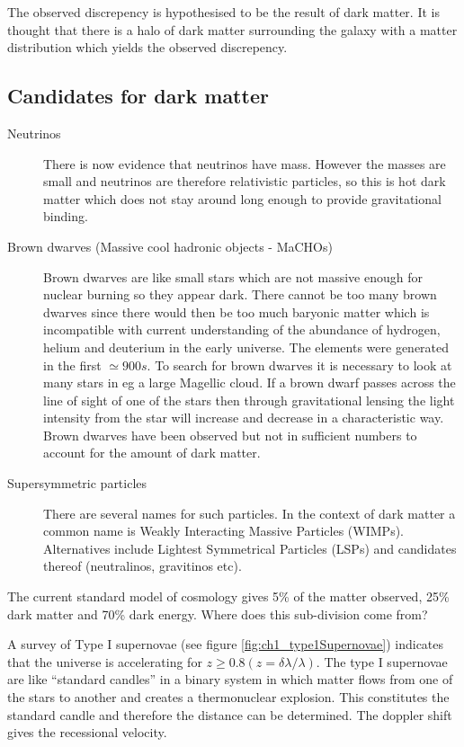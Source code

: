 The observed discrepency is hypothesised to be the result of dark matter.  It is thought that there is a halo of dark matter surrounding the galaxy with a matter distribution which yields the observed discrepency.

\subsection{Candidates for dark matter}

\begin{description}
  \item[Neutrinos]There is now evidence that neutrinos have mass.  However the masses are small and neutrinos are therefore relativistic particles, so this is hot dark matter which does not stay around long enough to provide gravitational binding.
  \item[Brown dwarves (Massive cool hadronic objects - MaCHOs)]Brown dwarves are like small stars which are not massive enough for nuclear burning so they appear dark.  There cannot be too many brown dwarves since there would then be too much baryonic matter which is incompatible with current understanding of the abundance of hydrogen, helium and deuterium in the early universe.  The elements were generated in the first $\simeq 900 s$.  To search for brown dwarves it is necessary to look at many stars in eg a large Magellic cloud.  If a brown dwarf passes across the line of sight of one of the stars then through gravitational lensing the light intensity from the star will increase and decrease in a characteristic way.  Brown dwarves have been observed but not in sufficient numbers to account for the amount of dark matter.
  \item[Supersymmetric particles]There are several names for such particles.  In the context of dark matter a common name is Weakly Interacting Massive Particles (WIMPs).  Alternatives include Lightest Symmetrical Particles (LSPs) and candidates thereof (neutralinos, gravitinos etc).
\end{description}

The current standard model of cosmology gives 5\% of the matter observed, 25\% dark matter and 70\% dark energy.  Where does this sub-division come from?

A survey of Type I supernovae (see figure \ref{fig:ch1_type1Supernovae}) indicates that the universe is accelerating for $z \ge 0.8 (z = \delta \lambda/\lambda)$.  The type I supernovae are like ``standard candles'' in a binary system in which matter flows from one of the stars to another and creates a thermonuclear explosion.  This constitutes the standard candle and therefore the distance can be determined.  The doppler shift gives the recessional velocity.


